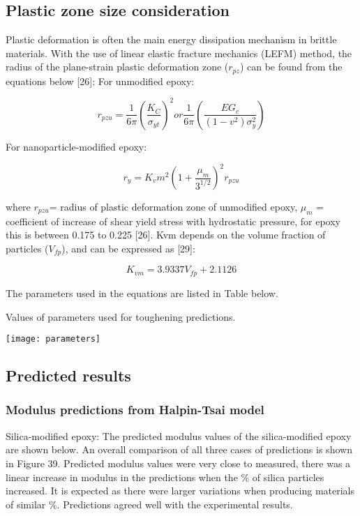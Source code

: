 \documentclass[numbers=noendperiod,chapterprefix=on]{icldt} %
\begin{document}
\subsection{Plastic zone size consideration }
Plastic deformation is often the main energy dissipation mechanism in brittle materials. With the use of linear elastic fracture mechanics (LEFM) method, the radius of the plane-strain plastic deformation zone ($r_{pz}$) can be found from the equations below [26]:
For unmodified epoxy: 

\begin{equation} 
r_{pzu}=\frac{1}{6π}
\left( \frac {K_C}{\sigma_{yt}}\right) ^2 or \frac {1}{6π}  \left(\frac{EG_c}{(1-v^2)\sigma_y^2}\right) 
\end{equation}

For nanoparticle-modified epoxy: 

\begin{equation}
r_y=K_vm^2
\left(1+\frac {μ_m}{3^{1/2}}\right)^2r_{pzu}
\end{equation}

where $r_{pzu}$= radius of plastic deformation zone of unmodified epoxy, $\mu_m$ = coefficient of increase of shear yield stress with hydrostatic pressure, for epoxy this is between 0.175 to 0.225 [26].
Kvm depends on the volume fraction of particles ($V_{fp}$), and can be expressed as [29]: 

\begin{equation} 
K_{vm}=3.9337V_{fp}+2.1126
\end{equation}

The parameters used in the equations are listed in Table below.

\begin{table}[!htpb]
\centering
\caption{Values of parameters used for toughening predictions.} %
\texttt{[image: parameters]}
\end{table}

\subsection{Predicted results}
\subsubsection{Modulus predictions from Halpin-Tsai model}
Silica-modified epoxy:
\newline
The predicted modulus values of the silica-modified epoxy are shown below. An overall comparison of all three cases of predictions is shown in Figure 39. Predicted modulus values were very close to measured, there was a linear increase in modulus in the predictions when the \% of silica particles increased. It is expected as there were larger variations when producing materials of similar \%. Predictions agreed well with the experimental results. 
\end{document}
